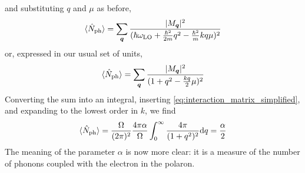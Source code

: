 and substituting $q$ and $\mu$ as before,
\begin{equation}
    \langle \hat{N}_\text{ph} \rangle = \sum_{\mathbf{\boldsymbol{q}}} \frac{|M_{\mathbf{\boldsymbol{q}}}|^2}{(\hbar\omega_\text{LO} + \frac{\hbar^2}{2m}q^2 - \frac{\hbar^2}{m} kq\mu)^2}
\end{equation}
or, expressed in our usual set of units,
\begin{equation}
    \langle \hat{N}_\text{ph} \rangle = \sum_{\mathbf{\boldsymbol{q}}} \frac{|M_{\mathbf{\boldsymbol{q}}}|^2}{(1 + q^2 - \frac{kq}{2}\mu)^2}
\end{equation}
Converting the sum into an integral, inserting \cref{eq:interaction_matrix_simplified}, and expanding to the lowest order in $k$, we find
\begin{equation}
    \langle \oper{N}_\text{ph} \rangle = \frac{\Omega}{(2\pi)^2} \frac{4\pi\alpha}{\Omega} \int_0^\infty \frac{4\pi}{(1+q^2)^2} \differential q = \frac{\alpha}{2}
\end{equation}
The meaning of the parameter $\alpha$ is now more clear: it is a measure of the number of phonons coupled with the electron in the polaron.

